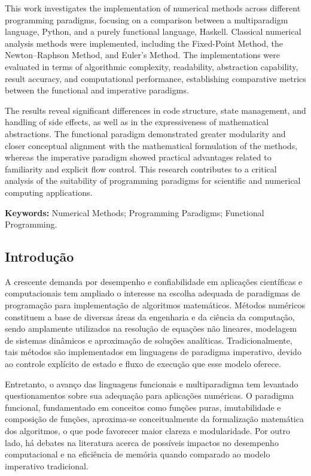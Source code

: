 \vspace{0.5em}

This work investigates the implementation of numerical methods across
different programming paradigms, focusing on a comparison between a
multiparadigm language, Python, and a purely functional language, Haskell.
Classical numerical analysis methods were implemented, including the
Fixed-Point Method, the Newton--Raphson Method, and Euler's Method. The
implementations were evaluated in terms of algorithmic complexity, readability,
abstraction capability, result accuracy, and computational performance,
establishing comparative metrics between the functional and imperative
paradigms.

The results reveal significant differences in code structure, state management,
and handling of side effects, as well as in the expressiveness of mathematical
abstractions. The functional paradigm demonstrated greater modularity and
closer conceptual alignment with the mathematical formulation of the methods,
whereas the imperative paradigm showed practical advantages related to
familiarity and explicit flow control. This research contributes to a critical
analysis of the suitability of programming paradigms for scientific and
numerical computing applications.

\noindent
\textbf{Keywords:} Numerical Methods; Programming Paradigms; Functional
Programming.

\subsection{Introdução}

A crescente demanda por desempenho e confiabilidade em aplicações científicas
e computacionais tem ampliado o interesse na escolha adequada de paradigmas de
programação para implementação de algoritmos matemáticos. Métodos numéricos
constituem a base de diversas áreas da engenharia e da ciência da computação,
sendo amplamente utilizados na resolução de equações não lineares, modelagem
de sistemas dinâmicos e aproximação de soluções analíticas. Tradicionalmente,
tais métodos são implementados em linguagens de paradigma imperativo, devido
ao controle explícito de estado e fluxo de execução que esse modelo oferece.

Entretanto, o avanço das linguagens funcionais e multiparadigma tem levantado
questionamentos sobre sua adequação para aplicações numéricas. O paradigma
funcional, fundamentado em conceitos como funções puras, imutabilidade e
composição de funções, aproxima-se conceitualmente da formalização matemática
dos algoritmos, o que pode favorecer maior clareza e modularidade. Por outro
lado, há debates na literatura acerca de possíveis impactos no desempenho
computacional e na eficiência de memória quando comparado ao modelo imperativo
tradicional.

